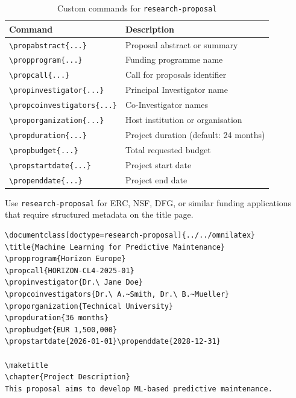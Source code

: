 \begin{table}[htbp]
    \centering
    \caption{Custom commands for \texttt{research-proposal}}
    \label{tab:proposal-commands}
    \begin{tabular}{@{} l p{8cm} @{}}
        \toprule
        \textbf{Command} & \textbf{Description} \\
        \midrule
        \texttt{\textbackslash propabstract\{...\}}         & Proposal abstract or summary \\
        \texttt{\textbackslash propprogram\{...\}}          & Funding programme name \\
        \texttt{\textbackslash propcall\{...\}}             & Call for proposals identifier \\
        \texttt{\textbackslash propinvestigator\{...\}}     & Principal Investigator name \\
        \texttt{\textbackslash propcoinvestigators\{...\}}  & Co-Investigator names \\
        \texttt{\textbackslash proporganization\{...\}}     & Host institution or organisation \\
        \texttt{\textbackslash propduration\{...\}}         & Project duration (default: 24 months) \\
        \texttt{\textbackslash propbudget\{...\}}           & Total requested budget \\
        \texttt{\textbackslash propstartdate\{...\}}        & Project start date \\
        \texttt{\textbackslash propenddate\{...\}}          & Project end date \\
        \bottomrule
    \end{tabular}
\end{table}

Use \texttt{research-proposal} for ERC, NSF, DFG, or similar funding
applications that require structured metadata on the title page.

\begin{verbatim}
\documentclass[doctype=research-proposal]{../../omnilatex}
\title{Machine Learning for Predictive Maintenance}
\propprogram{Horizon Europe}
\propcall{HORIZON-CL4-2025-01}
\propinvestigator{Dr.\ Jane Doe}
\propcoinvestigators{Dr.\ A.~Smith, Dr.\ B.~Mueller}
\proporganization{Technical University}
\propduration{36 months}
\propbudget{EUR 1,500,000}
\propstartdate{2026-01-01}\propenddate{2028-12-31}

\maketitle
\chapter{Project Description}
This proposal aims to develop ML-based predictive maintenance.

\end{verbatim}

